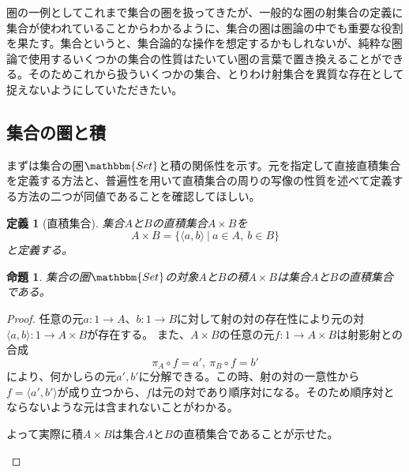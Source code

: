 \documentclass[uplatex,dvipdfmx]{jsarticle}
\newcommand{\cat}[1]{\mathbbm{#1}}
\newcommand{\arrow}{\rightarrow}
\newcommand{\tuple}[1]{\langle #1\rangle}
\newcommand{\mor}[3]{#1:#2\arrow #3}
\newtheorem{proof}{証明}[section]
\newtheorem{prop}{命題}[section]
\newtheorem{define}{定義}[section]
\numberwithin{proof}{subsection}
\numberwithin{prop}{subsection}
\numberwithin{define}{subsection}
\begin{document}
  圏の一例としてこれまで集合の圏を扱ってきたが、一般的な圏の射集合の定義に集合が使われていることからわかるように、集合の圏は圏論の中でも重要な役割を果たす。集合というと、集合論的な操作を想定するかもしれないが、純粋な圏論で使用するいくつかの集合の性質はたいてい圏の言葉で置き換えることができる。そのためこれから扱ういくつかの集合、とりわけ射集合を異質な存在として捉えないようにしていただきたい。

  \subsection{集合の圏と積}
	まずは集合の圏$\cat{Set}$と積の関係性を示す。元を指定して直接直積集合を定義する方法と、普遍性を用いて直積集合の周りの写像の性質を述べて定義する方法の二つが同値であることを確認してほしい。
	\begin{define}[直積集合]
		集合$A$と$B$の直積集合$A\times B$を\[A\times B =\{\tuple{a,b}\ |\ a\in A,\ b\in B\}\]と定義する。
	\end{define}
	\begin{prop}
		集合の圏$\cat{Set}$の対象$A$と$B$の積$A\times B$は集合$A$と$B$の直積集合である。
	\end{prop}
	\begin{proof}
		任意の元$\mor{a}{1}{A}$、$\mor{b}{1}{B}$に対して射の対の存在性により元の対$\mor{\tuple{a,b}}{1}{A\times B}$が存在する。
		また、$A\times B$の任意の元$\mor{f}{1}{A\times B}$は射影射との合成\[\pi_A\circ f=a',\ \pi_B\circ f=b'\]により、何かしらの元$a',b'$に分解できる。この時、射の対の一意性から$f=\tuple{a',b'}$が成り立つから、$f$は元の対であり順序対になる。そのため順序対とならないような元は含まれないことがわかる。

		よって実際に積$A\times B$は集合$A$と$B$の直積集合であることが示せた。
		\begin{center}
		\end{center}
	\end{proof}
\end{document}
